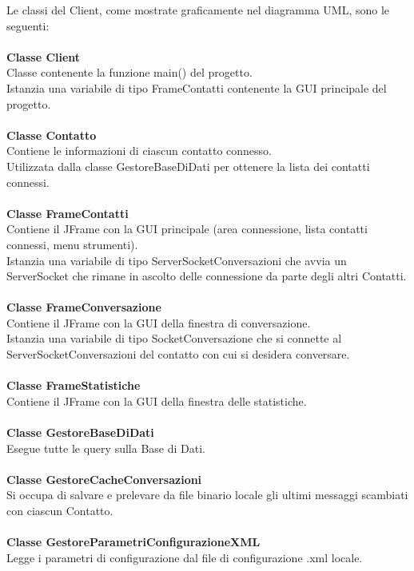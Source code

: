 \documentclass[a4paper, 11pt]{article} %
\begin{document}
Le classi del Client, come mostrate graficamente nel diagramma UML, sono le seguenti:\\
\\
\textbf{Classe Client}\\
Classe contenente la funzione main() del progetto.\\
Istanzia una variabile di tipo FrameContatti contenente la GUI principale del progetto.\\
\\
\textbf{Classe Contatto}\\
Contiene le informazioni di ciascun contatto connesso.\\
Utilizzata dalla classe GestoreBaseDiDati per ottenere la lista dei contatti connessi.\\
\\
\textbf{Classe FrameContatti}\\
Contiene il JFrame con la GUI principale (area connessione, lista contatti connessi, menu strumenti).\\
Istanzia una variabile di tipo ServerSocketConversazioni che avvia un ServerSocket che rimane in ascolto delle connessione da parte degli altri Contatti.\\
\\
\textbf{Classe FrameConversazione}\\
Contiene il JFrame con la GUI della finestra di conversazione.\\
Istanzia una variabile di tipo SocketConversazione che si connette al  ServerSocketConversazioni del contatto con cui si desidera conversare.\\
\\
\textbf{Classe FrameStatistiche}\\
Contiene il JFrame con la GUI della finestra delle statistiche.\\
\\
\textbf{Classe GestoreBaseDiDati}\\
Esegue tutte le query sulla Base di Dati.\\
\\
\textbf{Classe GestoreCacheConversazioni}\\
Si occupa di salvare e prelevare da file binario locale gli ultimi messaggi scambiati con ciascun Contatto.\\
\\
\textbf{Classe GestoreParametriConfigurazioneXML}\\
Legge i parametri di configurazione dal file di configurazione .xml locale.\\
\end{document}
